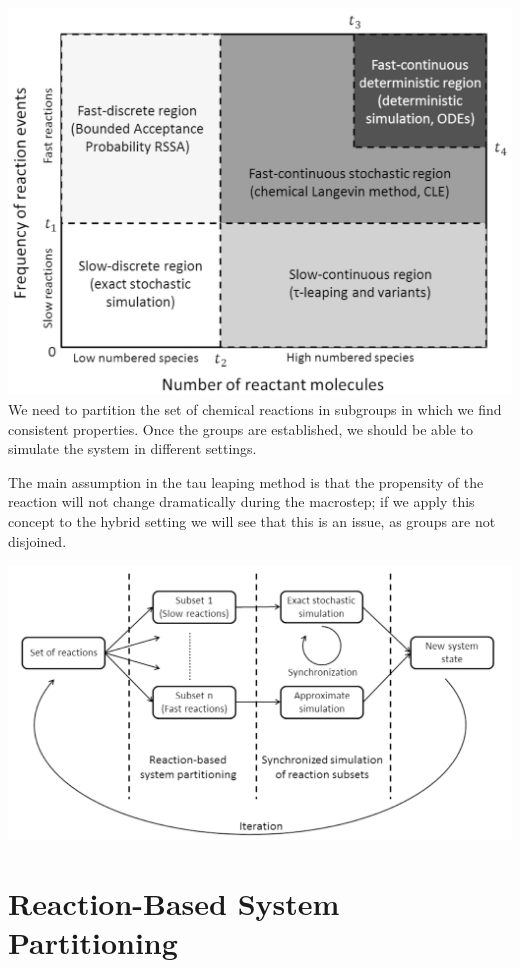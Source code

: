 \includegraphics{06_images/regions.png} We need to partition the set of
chemical reactions in subgroups in which we find consistent properties.
Once the groups are established, we should be able to simulate the
system in different settings.

The main assumption in the tau leaping method is that the propensity of
the reaction will not change dramatically during the macrostep; if we
apply this concept to the hybrid setting we will see that this is an
issue, as groups are not disjoined.

\includegraphics{06_images/scheme.png}

\hypertarget{reaction-based-system-partitioning}{%
\section{Reaction-Based System
Partitioning}\label{reaction-based-system-partitioning}}

